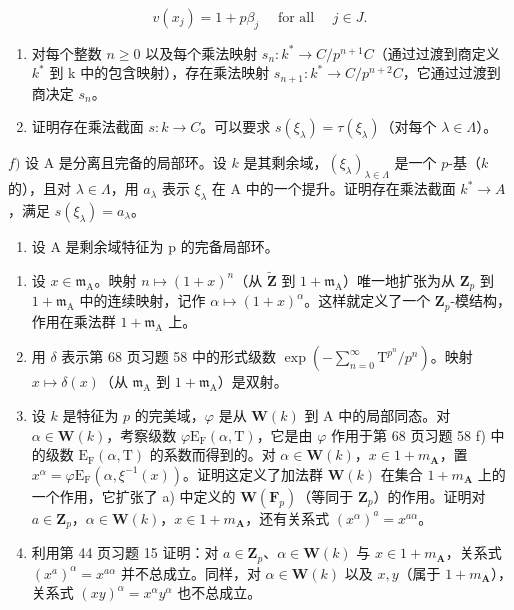 \[
v (x _ {j}) = 1 + p \beta_ {j} \quad \text { for all } \quad j \in J.
\]

\begin{enumerate}
\def\labelenumi{\alph{enumi})}
\setcounter{enumi}{3}
\item
  对每个整数 \(n \geqslant 0\) 以及每个乘法映射 \(s_{n}: k^{*} \to C/p^{n+1}C\)（通过过渡到商定义 \(k^{*}\) 到 k 中的包含映射），存在乘法映射 \(s_{n+1}: k^{*} \to C/p^{n+2}C\)，它通过过渡到商决定 \(s_{n}\)。
\item
  证明存在乘法截面 \(s:k\to C\)。可以要求 \(s(\xi_{\lambda})=\tau(\xi_{\lambda})\)（对每个 \(\lambda\in\Lambda\)）。
\end{enumerate}

\(f)\) 设 A 是分离且完备的局部环。设 \(k\) 是其剩余域，\((\xi_{\lambda})_{\lambda \in \Lambda}\) 是一个 \(p\)-基（\(k\) 的），且对 \(\lambda \in \Lambda\)，用 \(a_{\lambda}\) 表示 \(\xi_{\lambda}\) 在 A 中的一个提升。证明存在乘法截面 \(k^{*} \to A\)，满足 \(s(\xi_{\lambda}) = a_{\lambda}\)。

\begin{enumerate}
\def\labelenumi{\arabic{enumi})}
\setcounter{enumi}{11}
\tightlist
\item
  设 A 是剩余域特征为 p 的完备局部环。
\end{enumerate}

\begin{enumerate}
\def\labelenumi{\alph{enumi})}
\item
  设 \(x \in \mathfrak{m}_{\mathrm{A}}\)。映射 \(n \mapsto (1 + x)^n\)（从 \(\tilde{\mathbf{Z}}\) 到 \(1 + \mathfrak{m}_{\mathrm{A}}\)）唯一地扩张为从 \(\mathbf{Z}_p\) 到 \(1 + \mathfrak{m}_{\mathrm{A}}\) 中的连续映射，记作 \(\alpha \mapsto (1 + x)^{\alpha}\)。这样就定义了一个 \(\mathbf{Z}_p\)-模结构，作用在乘法群 \(1 + \mathfrak{m}_{\mathrm{A}}\) 上。
\item
  用 \(\delta\) 表示第 68 页习题 58 中的形式级数 \(\exp\left(-\sum_{n=0}^{\infty}\mathrm{T}^{p^n}/p^n\right)\)。映射 \(x \mapsto \delta(x)\)（从 \(\mathfrak{m}_{\mathrm{A}}\) 到 \(1 + \mathfrak{m}_{\mathrm{A}}\)）是双射。
\item
  设 \(k\) 是特征为 \(p\) 的完美域，\(\varphi\) 是从 \(\mathbf{W}(k)\) 到 A 中的局部同态。对 \(\alpha \in \mathbf{W}(k)\)，考察级数 \(\varphi \mathrm{E}_{\mathrm{F}}(\alpha, \mathrm{T})\)，它是由 \(\varphi\) 作用于第 68 页习题 58 f) 中的级数 \(\mathrm{E}_{\mathrm{F}}(\alpha, \mathrm{T})\) 的系数而得到的。对 \(\alpha \in \mathbf{W}(k)\)，\(x \in 1 + m_{\mathbf{A}}\)，置 \(x^{\alpha} = \varphi \mathrm{E}_{\mathrm{F}}(\alpha, \xi^{-1}(x))\)。证明这定义了加法群 \(\mathbf{W}(k)\) 在集合 \(1 + m_{\mathbf{A}}\) 上的一个作用，它扩张了 a) 中定义的 \(\mathbf{W}(\mathbf{F}_p)\)（等同于 \(\mathbf{Z}_p\)）的作用。证明对 \(a \in \mathbf{Z}_p\)，\(\alpha \in \mathbf{W}(k)\)，\(x \in 1 + m_{\mathbf{A}}\)，还有关系式 \((x^{\alpha})^{a} = x^{a\alpha}\)。
\item
  利用第 44 页习题 15 证明：对 \(a \in \mathbf{Z}_{p}\)、\(\alpha \in \mathbf{W}(k)\) 与 \(x \in 1 + m_{\mathbf{A}}\)，关系式 \((x^{a})^{\alpha} = x^{a\alpha}\) 并不总成立。同样，对 \(\alpha \in \mathbf{W}(k)\) 以及 \(x, y\)（属于 \(1 + m_{\mathbf{A}}\)），关系式 \((xy)^{\alpha} = x^{\alpha}y^{\alpha}\) 也不总成立。
\end{enumerate}

